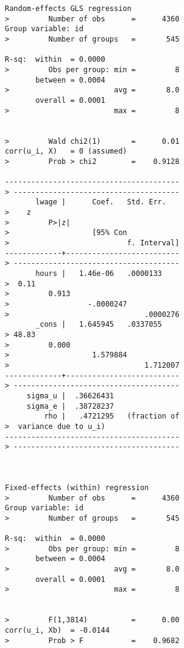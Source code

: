 \documentclass[]{article}
\begin{document}
\begin{verbatim}
Random-effects GLS regression           
>         Number of obs      =      4360
Group variable: id                      
>         Number of groups   =       545

R-sq:  within  = 0.0000                 
>         Obs per group: min =         8
       between = 0.0004                 
>                        avg =       8.0
       overall = 0.0001                 
>                        max =         8

                                        
>         Wald chi2(1)       =      0.01
corr(u_i, X)   = 0 (assumed)            
>         Prob > chi2        =    0.9128

----------------------------------------
> --------------------------------------
       lwage |      Coef.   Std. Err.   
>    z                                  
>         P>|z|                         
>                   [95% Con            
>                           f. Interval]
-------------+--------------------------
> --------------------------------------
       hours |   1.46e-06   .0000133    
>  0.11                                 
>         0.913                         
>                  -.0000247            
>                               .0000276
       _cons |   1.645945   .0337055    
> 48.83                                 
>         0.000                         
>                   1.579884            
>                               1.712007
-------------+--------------------------
> --------------------------------------
     sigma_u |  .36626431
     sigma_e |  .38728237
         rho |   .4721295   (fraction of
>  variance due to u_i)
----------------------------------------
> --------------------------------------



Fixed-effects (within) regression       
>         Number of obs      =      4360
Group variable: id                      
>         Number of groups   =       545

R-sq:  within  = 0.0000                 
>         Obs per group: min =         8
       between = 0.0004                 
>                        avg =       8.0
       overall = 0.0001                 
>                        max =         8

                                        
>         F(1,3814)          =      0.00
corr(u_i, Xb)  = -0.0144                
>         Prob > F           =    0.9682


\end{verbatim}
\end{document}
